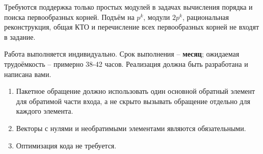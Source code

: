 \documentclass{ca-capstone}
\begin{document}
Требуются поддержка только простых модулей в задачах вычисления порядка и поиска первообразных 
корней. Подъём на $p^k$, модули $2p^k$, рациональная реконструкция, общая КТО и перечисление всех
первообразных корней не входят в задание.

\schedule
Работа выполняется индивидуально. Срок выполнения -- \textbf{месяц}; ожидаемая трудоёмкость
-- примерно 38-42 часов. Реализация должна быть разработана и написана вами.

\remarks
\begin{enumerate}
  \item Пакетное обращение должно использовать один основной обратный элемент для обратимой
    части входа, а не скрыто вызывать обращение отдельно для каждого элемента.
  \item Векторы с нулями и необратимыми элементами являются обязательными.
  \item Оптимизация кода не требуется.
\end{enumerate}

\end{document}
